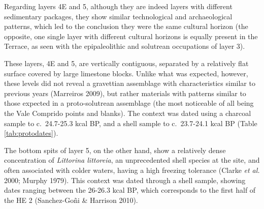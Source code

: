 \documentclass[12pt,twoside]{reedthesis}
\begin{document}
Regarding layers 4E and 5, although they are indeed layers with different sedimentary packages, they show similar technological and archaeological patterns, which led to the conclusion they were the same cultural horizon (the opposite, one single layer with different cultural horizons is equally present in the Terrace, as seen with the epipaleolithic and solutrean occupations of layer 3).

These layers, 4E and 5, are vertically contiguous, separated by a relatively flat surface covered by large limestone blocks. Unlike what was expected, however, these levels did not reveal a gravettian assemblage with characteristics similar to previous years (Marreiros 2009), but rather materials with patterns similar to those expected in a proto-solutrean assemblage (the most noticeable of all being the Vale Comprido points and blanks). The context was dated using a charcoal sample to c.~24.7-25.3 kcal BP, and a shell sample to c.~23.7-24.1 kcal BP (Table \ref{tab:protodates}).

The bottom spits of layer 5, on the other hand, show a relatively dense concentration of \emph{Littorina littoreia}, an unprecedented shell species at the site, and often associated with colder waters, having a high freezing tolerance (Clarke \emph{et al.} 2000; Murphy 1979). This context was dated through a shell sample, showing dates ranging between the 26-26.3 kcal BP, which corresponds to the first half of the HE 2 (Sanchez-Goñi \& Harrison 2010).
\end{document}

